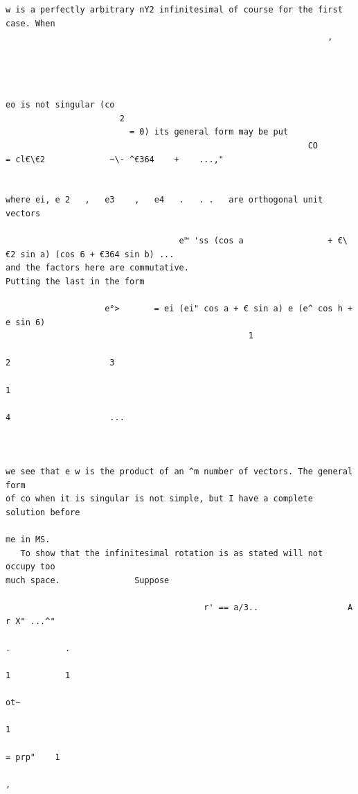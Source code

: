 \documentclass[10pt]{article}
\begin{document}
\begin{verbatim}
w is a perfectly arbitrary nY2 infinitesimal of course for the first case. When
                                                                 ,




eo is not singular (co
                       2
                         = 0) its general form may be put
                                                             CO        = cl€\€2             ~\- ^€364    +    ...,"


where ei, e 2   ,   e3    ,   e4   .   . .   are orthogonal unit vectors

                                   e™ 'ss (cos a                 + €\€2 sin a) (cos 6 + €364 sin b) ...
and the factors here are commutative.                                                            Putting the last in the form

                    e°>       = ei (ei" cos a + € sin a) e (e^ cos h + e sin 6)
                                                 1
                                                                            2                    3
                                                                                                             1
                                                                                                                               4                    ...



we see that e w is the product of an ^m number of vectors. The general form
of co when it is singular is not simple, but I have a complete solution before

me in MS.
   To show that the infinitesimal rotation is as stated will not occupy too
much space.               Suppose

                                        r' == a/3..                  A r X" ...^"
                                                                        .           .
                                                                                             1           1
                                                                                                             ot~
                                                                                                                     1
                                                                                                                         = prp"    1
                                                                                                                                       ,





\end{verbatim}
\end{document}
